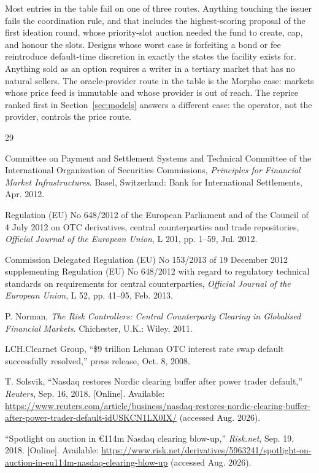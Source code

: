 \documentclass[11pt,a4paper]{article}
\begin{document}
Most entries in the table fail on one of three routes. Anything touching the issuer fails the coordination rule, and that includes the highest-scoring proposal of the first ideation round, whose priority-slot auction needed the fund to create, cap, and honour the slots. Designs whose worst case is forfeiting a bond or fee reintroduce default-time discretion in exactly the states the facility exists for. Anything sold as an option requires a writer in a tertiary market that has no natural sellers. The oracle-provider route in the table is the Morpho case: markets whose price feed is immutable and whose provider is out of reach. The reprice ranked first in Section~\ref{sec:models} answers a different case: the operator, not the provider, controls the price route.

\clearpage
\begin{thebibliography}{29}
\small

 Committee on Payment and Settlement Systems and Technical Committee of the International Organization of Securities Commissions, \emph{Principles for Financial Market Infrastructures}. Basel, Switzerland: Bank for International Settlements, Apr. 2012.

 Regulation (EU) No 648/2012 of the European Parliament and of the Council of 4 July 2012 on OTC derivatives, central counterparties and trade repositories, \emph{Official Journal of the European Union}, L 201, pp. 1--59, Jul. 2012.

 Commission Delegated Regulation (EU) No 153/2013 of 19 December 2012 supplementing Regulation (EU) No 648/2012 with regard to regulatory technical standards on requirements for central counterparties, \emph{Official Journal of the European Union}, L 52, pp. 41--95, Feb. 2013.

 P. Norman, \emph{The Risk Controllers: Central Counterparty Clearing in Globalised Financial Markets}. Chichester, U.K.: Wiley, 2011.

 LCH.Clearnet Group, ``\$9 trillion Lehman OTC interest rate swap default successfully resolved,'' press release, Oct. 8, 2008.

 T. Solsvik, ``Nasdaq restores Nordic clearing buffer after power trader default,'' \emph{Reuters}, Sep. 16, 2018. [Online]. Available: \url{https://www.reuters.com/article/business/nasdaq-restores-nordic-clearing-buffer-after-power-trader-default-idUSKCN1LX0IX/} (accessed Aug. 2026).

 ``Spotlight on auction in \euro{}114m Nasdaq clearing blow-up,'' \emph{Risk.net}, Sep. 19, 2018. [Online]. Available: \url{https://www.risk.net/derivatives/5963241/spotlight-on-auction-in-eu114m-nasdaq-clearing-blow-up} (accessed Aug. 2026).


\end{thebibliography}
\end{document}
